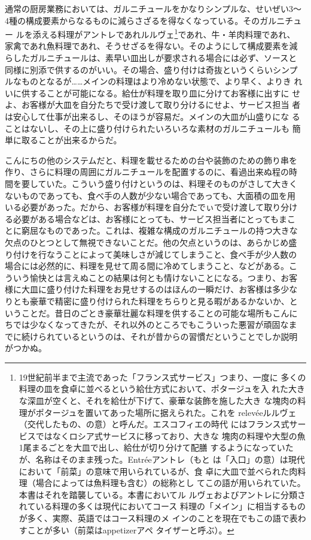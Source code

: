 通常の厨房業務においては、ガルニチュールをかなりシンプルな、せいぜい3〜
4種の構成要素からなるものに減らさざるを得なくなっている。そのガルニチュー
ルを添える料理がアントレであれルルヴェ\footnote{19世紀前半まで主流であった「フランス式サービス」つまり、一度に
  多くの料理の皿を食卓に並べるという給仕方式において、ポタージュを入
  れた大きな深皿が空くと、それを給仕が下げて、豪華な装飾を施した大き
  な塊肉の料理がポタージュを置いてあった場所に据えられた。これを
  relevéeルルヴェ（交代したもの、の意）と呼んだ。エスコフィエの時代
  にはフランス式サービスではなくロシア式サービスに移っており、大きな
  塊肉の料理や大型の魚1尾まるごとを大皿で出し、給仕が切り分けて配膳
  するようになっていたが、名称はそのまま残った。Entréeアントレ（もと
  は「入口」の意）は現代において「前菜」の意味で用いられているが、食
  卓に大皿で並べられた肉料理（場合によっては魚料理も含む）の総称とし
  てこの語が用いられていた。本書はそれを踏襲している。本書においてル
  ルヴェおよびアントレに分類されている料理の多くは現代においてコース
  料理の「メイン」に相当するものが多く、実際、英語ではコース料理のメ
  インのことを現在でもこの語で表わすことが多い（前菜はappetizerアペ
  タイザーと呼ぶ）。}であれ、牛・羊肉料理であれ、
家禽であれ魚料理であれ、そうせざるを得ない。そのようにして構成要素を減
らしたガルニチュールは、素早い皿出しが要求される場合には必ず、ソースと
同様に別添で供するのがいい。その場合、盛り付けは奇抜というくらいシンプ
ルなものとなるが\ldots{}\ldots{}メインの料理はより冷めない状態で、より早く、よりき
れいに供することが可能になる。給仕が料理を取り皿に分けてお客様に出すに
せよ、お客様が大皿を自分たちで受け渡して取り分けるにせよ、サービス担当
者は安心して仕事が出来るし、そのほうが容易だ。メインの大皿が山盛りにな
ることはないし、その上に盛り付けられたいろいろな素材のガルニチュールも
簡単に取ることが出来るからだ。

こんにちの他のシステムだと、料理を載せるための台や装飾のための飾り串を
作り、さらに料理の周囲にガルニチュールを配置するのに、看過出来ぬ程の時
間を要していた。こういう盛り付けというのは、料理そのものがさして大きく
ないものであっても、食べ手の人数が少ない場合であっても、大面積の皿を用
いる必要があった。だから、お客様が料理を自分たでぃで受け渡して取り分け
る必要がある場合などは、お客様にとっても、サービス担当者にとってもまこ
とに窮屈なものであった。これは、複雑な構成のガルニチュールの持つ大きな
欠点のひとつとして無視できないことだ。他の欠点というのは、あらかじめ盛
り付けを行なうことによって美味しさが減じてしまうこと、食べ手が少人数の
場合には必然的に、料理を見せて周る間に冷めてしまうこと、などがある。こ
ういう愉快とは言えぬことの結果は何とも情けないことになる。つまり、お客
様に大皿に盛り付けた料理をお見せするのはほんの一瞬だけ、お客様は多少な
りとも豪華で精密に盛り付けられた料理をちらりと見る暇があるかないか、と
いうことだ。昔日のごとき豪華壮麗な料理を供することの可能な場所もこんに
ちでは少なくなってきたが、それ以外のところでもこういった悪習が頑固なま
でに続けられているというのは、それが昔からの習慣だということでしか説明
がつかぬ。

